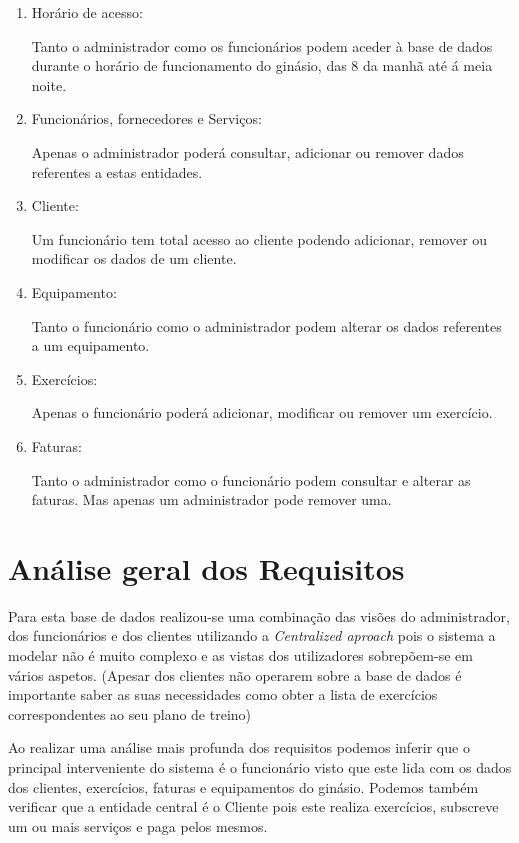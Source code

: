 \begin{enumerate}
\item Horário de acesso:\par
Tanto o administrador como os funcionários podem aceder à base de dados durante o horário de funcionamento do ginásio, das 8 da manhã até á meia noite.
\item Funcionários, fornecedores e Serviços:\par
Apenas o administrador poderá consultar, adicionar ou remover dados referentes a estas entidades.
\item Cliente:\par
Um funcionário tem total acesso ao cliente podendo adicionar, remover ou modificar os dados de um cliente.
\item Equipamento:\par
Tanto o funcionário como o administrador podem alterar os dados referentes a um equipamento.
\item Exercícios:\par
Apenas o funcionário poderá adicionar, modificar ou remover um exercício.
\item Faturas:\par
Tanto o administrador como o funcionário podem consultar e alterar as faturas. Mas apenas um administrador pode remover uma.

\end{enumerate}

\section{Análise geral dos Requisitos}

Para esta base de dados realizou-se uma combinação das visões do administrador, dos funcionários e dos clientes utilizando a  \textit{Centralized aproach} pois o sistema a modelar não é muito complexo e as vistas dos utilizadores sobrepõem-se em vários aspetos. (Apesar dos clientes não operarem sobre a base de dados é importante saber as suas necessidades como obter a lista de exercícios correspondentes ao seu plano de treino)
\newline
\par
Ao realizar uma análise mais profunda dos requisitos podemos inferir que o principal interveniente do sistema é o funcionário visto que este lida com os dados dos clientes, exercícios, faturas e equipamentos do ginásio.
Podemos também verificar que a entidade central é o Cliente pois este realiza exercícios, subscreve um ou mais serviços e paga pelos mesmos.

